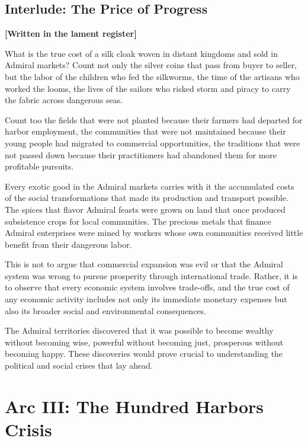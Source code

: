 \subsection{Interlude: The Price of
Progress}\label{interlude-the-price-of-progress}

\textbf{{[}Written in the lament register{]}}

What is the true cost of a silk cloak woven in distant kingdoms and sold
in Admiral markets? Count not only the silver coins that pass from buyer
to seller, but the labor of the children who fed the silkworms, the time
of the artisans who worked the looms, the lives of the sailors who
risked storm and piracy to carry the fabric across dangerous seas.

Count too the fields that were not planted because their farmers had
departed for harbor employment, the communities that were not maintained
because their young people had migrated to commercial opportunities, the
traditions that were not passed down because their practitioners had
abandoned them for more profitable pursuits.

Every exotic good in the Admiral markets carries with it the accumulated
costs of the social transformations that made its production and
transport possible. The spices that flavor Admiral feasts were grown on
land that once produced subsistence crops for local communities. The
precious metals that finance Admiral enterprises were mined by workers
whose own communities received little benefit from their dangerous
labor.

This is not to argue that commercial expansion was evil or that the
Admiral system was wrong to pursue prosperity through international
trade. Rather, it is to observe that every economic system involves
trade-offs, and the true cost of any economic activity includes not only
its immediate monetary expenses but also its broader social and
environmental consequences.

The Admiral territories discovered that it was possible to become
wealthy without becoming wise, powerful without becoming just,
prosperous without becoming happy. These discoveries would prove crucial
to understanding the political and social crises that lay ahead.

\section{Arc III: The Hundred Harbors
Crisis}\label{arc-iii-the-hundred-harbors-crisis}

